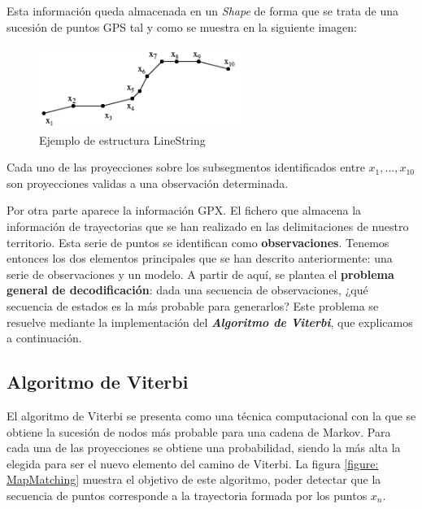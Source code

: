 Esta información queda almacenada en un \textit{Shape} de forma que se trata de una sucesión de puntos \ac{GPS} tal y como se muestra en la siguiente imagen:
\begin{figure}[htb]
\begin{center}
\includegraphics[width=0.6\textwidth]{./Imagenes/LineString.png}
\caption{Ejemplo de estructura LineString}
\label{figure: LineString}
\end{center}
\end{figure}

Cada uno de las proyecciones sobre los subsegmentos identificados entre $x_{1}, ..., x_{10}$ son proyecciones validas a una observación determinada.

Por otra parte aparece la información \ac{GPX}. El fichero que almacena la información de trayectorias que se han realizado en las delimitaciones de nuestro territorio. Esta serie de puntos se identifican como \textbf{observaciones}. Tenemos entonces los dos elementos principales que se han descrito anteriormente: una serie de observaciones y un modelo. A partir de aquí, se plantea el \textbf{problema general de decodificación}: dada una secuencia de observaciones, ¿qué secuencia de estados es la más probable para generarlos?
Este problema se resuelve mediante la implementación del \textbf{\textit{Algoritmo de Viterbi}}, que explicamos a continuación.

\subsection{Algoritmo de Viterbi}
El algoritmo de Viterbi se presenta como una técnica computacional con la que se obtiene la 
sucesión de nodos más probable para una cadena de Markov. Para cada una de las proyecciones 
se obtiene una probabilidad, siendo la más alta la elegida para ser el nuevo elemento del camino de 
Viterbi. La figura \ref{figure: MapMatching} muestra el objetivo de este algoritmo, poder detectar que la secuencia de puntos corresponde a la trayectoria formada por los puntos $x_{n}$.

